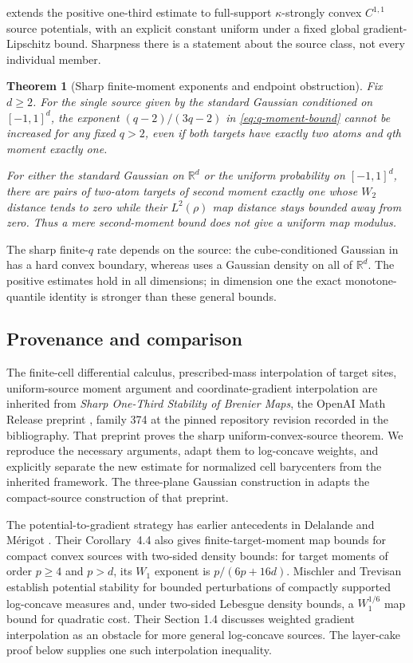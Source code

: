 \documentclass[11pt]{article}
\numberwithin{equation}{section}
\newtheorem{theorem}{Theorem}[section]
\theoremstyle{remark}
\newcommand{\R}{\mathbb R}
\begin{document}
 extends the positive one-third estimate to full-support $\kappa$-strongly convex $C^{1,1}$ source potentials, with an explicit constant uniform under a fixed global gradient-Lipschitz bound. Sharpness there is a statement about the source class, not every individual member.

\begin{theorem}[Sharp finite-moment exponents and endpoint obstruction]\label{thm:moment-sharp}
Fix $d\ge2$. For the single source given by the standard Gaussian conditioned on $[-1,1]^d$, the exponent $(q-2)/(3q-2)$ in \eqref{eq:q-moment-bound} cannot be increased for any fixed $q>2$, even if both targets have exactly two atoms and $q$th moment exactly one.

For either the standard Gaussian on $\R^d$ or the uniform probability on $[-1,1]^d$, there are pairs of two-atom targets of second moment exactly one whose $W_2$ distance tends to zero while their $L^2(\rho)$ map distance stays bounded away from zero. Thus a mere second-moment bound does not give a uniform map modulus.
\end{theorem}

The sharp finite-$q$ rate depends on the source: the cube-conditioned Gaussian in  has a hard convex boundary, whereas  uses a Gaussian density on all of $\R^d$. The positive estimates hold in all dimensions; in dimension one the exact monotone-quantile identity is stronger than these general bounds.

\subsection{Provenance and comparison}
The finite-cell differential calculus, prescribed-mass interpolation of target sites, uniform-source moment argument and coordinate-gradient interpolation are inherited from \emph{Sharp One-Third Stability of Brenier Maps}, the OpenAI Math Release preprint \cite{OpenAI2026}, family 374 at the pinned repository revision recorded in the bibliography. That preprint proves the sharp uniform-convex-source theorem. We reproduce the necessary arguments, adapt them to log-concave weights, and explicitly separate the new estimate for normalized cell barycenters from the inherited framework. The three-plane Gaussian construction in  adapts the compact-source construction of that preprint.

The potential-to-gradient strategy has earlier antecedents in Delalande and M\'erigot \cite[Proposition~4.1]{DelalandeMerigot2023}. Their Corollary~4.4 also gives finite-target-moment map bounds for compact convex sources with two-sided density bounds: for target moments of order $p\ge4$ and $p>d$, its $W_1$ exponent is $p/(6p+16d)$. Mischler and Trevisan \cite[Theorems 1.1--1.2]{MischlerTrevisan2026} establish potential stability for bounded perturbations of compactly supported log-concave measures and, under two-sided Lebesgue density bounds, a $W_1^{1/6}$ map bound for quadratic cost. Their Section 1.4 discusses weighted gradient interpolation as an obstacle for more general log-concave sources. The layer-cake proof below supplies one such interpolation inequality.
\end{document}
